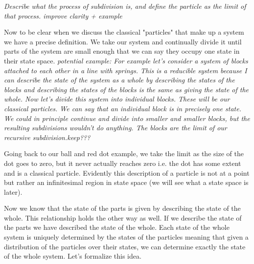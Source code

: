 \documentclass{article}
\begin{document}
	 
	 \emph{Describe what the process of subdivision is, and define the particle as the limit of that process. improve clarity + example}
	
	 Now to be clear when we discuss the classical "particles" that make up a system we have a precise definition. We take our system and continually divide it until parts of the system are small enough that we can say they occupy one state in their state space. 
	 \emph{potential example: For example let's consider a system of blocks attached to each other in a line with springs. This is a reducible system because I can describe the state of the system as a whole by describing the states of the blocks and describing the states of the blocks is the same as giving the state of the whole. Now let's divide this system into individual blocks. These will be our classical particles. We can say that an individual block is in precisely one state. We could in principle continue and divide into smaller and smaller blocks, but the resulting subdivisions wouldn't do anything. The blocks are the limit of our recursive subdivision.keep???}
	 
	 Going back to our ball and red dot example, we take the limit as the size of the dot goes to zero, but it never actually reaches zero i.e. the dot has some extent and is a classical particle. Evidently this description of a particle is not at a point but rather an infinitesimal region in state space (we will see what a state space is later).
	
	Now we know that the state of the parts is given by describing the state of the whole. This relationship holds the other way as well. If we describe the state of the parts we have described the state of the whole. Each state of the whole system is uniquely determined by the states of the particles meaning that given a distribution of the particles over their states, we can determine exactly the state of the whole system. Let's formalize this idea.
	
\end{document}
